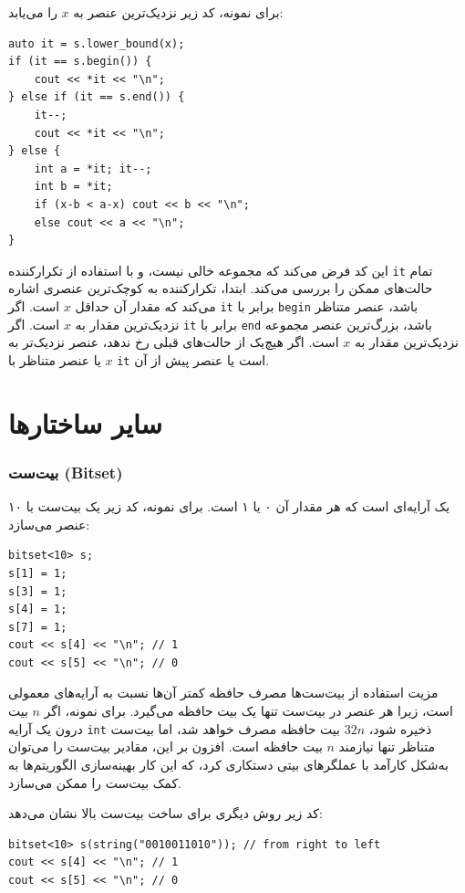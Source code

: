 \begin{samepage}
برای نمونه، کد زیر نزدیک‌ترین عنصر به $x$ را می‌یابد:

\begin{lstlisting}
auto it = s.lower_bound(x);
if (it == s.begin()) {
    cout << *it << "\n";
} else if (it == s.end()) {
    it--;
    cout << *it << "\n";
} else {
    int a = *it; it--;
    int b = *it;
    if (x-b < a-x) cout << b << "\n";
    else cout << a << "\n";
}
\end{lstlisting}

این کد فرض می‌کند که مجموعه خالی نیست، و با استفاده از تکرارکننده \texttt{it} تمام حالت‌های ممکن را بررسی می‌کند. ابتدا، تکرارکننده به کوچک‌ترین عنصری اشاره می‌کند که مقدار آن حداقل $x$ است. اگر \texttt{it} برابر با \texttt{begin} باشد، عنصر متناظر نزدیک‌ترین مقدار به $x$ است. اگر \texttt{it} برابر با \texttt{end} باشد، بزرگ‌ترین عنصر مجموعه نزدیک‌ترین مقدار به $x$ است. اگر هیچ‌یک از حالت‌های قبلی رخ ندهد، عنصر نزدیک‌تر به $x$ یا عنصر متناظر با \texttt{it} است یا عنصر پیش از آن.
\end{samepage}

\section{سایر ساختارها}

\subsubsection{بیت‌ست (Bitset)}


یک  آرایه‌ای است که هر مقدار آن ۰ یا ۱ است. برای نمونه، کد زیر یک بیت‌ست با ۱۰ عنصر می‌سازد:
\begin{lstlisting}
bitset<10> s;
s[1] = 1;
s[3] = 1;
s[4] = 1;
s[7] = 1;
cout << s[4] << "\n"; // 1
cout << s[5] << "\n"; // 0
\end{lstlisting}

مزیت استفاده از بیت‌ست‌ها مصرف حافظه کمتر آن‌ها نسبت به آرایه‌های معمولی است، زیرا هر عنصر در بیت‌ست تنها یک بیت حافظه می‌گیرد. برای نمونه، اگر $n$ بیت درون یک آرایه \texttt{int} ذخیره شود، $32n$ بیت حافظه مصرف خواهد شد، اما بیت‌ست متناظر تنها نیازمند $n$ بیت حافظه است. افزون بر این، مقادیر بیت‌ست را می‌توان به‌شکل کارآمد با عملگرهای بیتی دستکاری کرد، که این کار بهینه‌سازی الگوریتم‌ها به کمک بیت‌ست را ممکن می‌سازد.

کد زیر روش دیگری برای ساخت بیت‌ست بالا نشان می‌دهد:
\begin{lstlisting}
bitset<10> s(string("0010011010")); // from right to left
cout << s[4] << "\n"; // 1
cout << s[5] << "\n"; // 0
\end{lstlisting}

